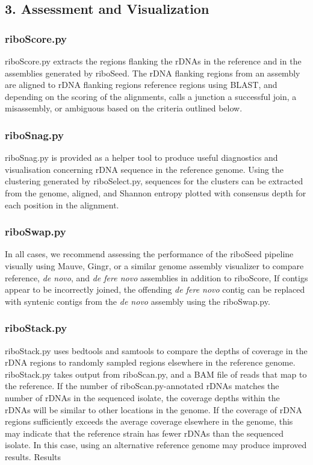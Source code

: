 \documentclass[11pt]{article}
\begin{document}
\begin{linenumbers}
\subsection*{3. Assessment and Visualization}
\subsubsection*{riboScore.py}
riboScore.py extracts the regions flanking the rDNAs in the reference and in the assemblies generated by riboSeed. The rDNA flanking regions from an assembly are aligned to rDNA flanking regions reference regions using BLAST, and depending on the scoring of the alignments, calls a junction a successful join, a misassembly, or ambiguous based on the criteria outlined below.
\subsubsection*{riboSnag.py}
riboSnag.py is provided as a helper tool to produce useful diagnostics and visualisation concerning rDNA sequence in the reference genome. Using the clustering generated by riboSelect.py, sequences for the clusters can be extracted from the genome, aligned, and Shannon entropy \cite{Schmitt1997} plotted with consensus depth for each position in the alignment.
\subsubsection*{riboSwap.py}
In all cases, we recommend assessing the performance of the riboSeed pipeline visually using Mauve\cite{Darling2004,Darling2011}, Gingr\cite{Treangen2014}, or a similar genome assembly visualizer to compare reference, \textit{de novo}, and \textit{de fere novo} assemblies in addition to riboScore, If contigs appear to be incorrectly joined, the offending \textit{de fere novo} contig can be replaced with syntenic contigs from the \textit{de novo} assembly using the riboSwap.py.


\subsubsection*{riboStack.py}
riboStack.py uses bedtools\cite{Quinlan2010} and samtools\cite{Li2009} to compare the depths of coverage in the rDNA regions to randomly sampled regions elsewhere in the reference genome. riboStack.py takes output from riboScan.py, and a BAM file of reads that map to the reference. If the number of riboScan.py-annotated rDNAs matches the number of rDNAs in the sequenced isolate, the coverage depths within the rDNAs will be similar to other locations in the genome. If the coverage of rDNA regions sufficiently exceeds the average coverage elsewhere in the genome, this may indicate that the reference strain has fewer rDNAs than the sequenced isolate. In this case, using an alternative reference genome may produce improved results.
Results




\end{linenumbers}
\end{document}

